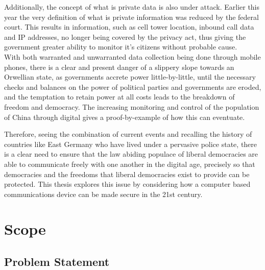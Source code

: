 Additionally, the concept of what is private data is also under attack.
Earlier this year the very definition of what is private information was reduced by the federal court.
This results in information, such as cell tower location, inbound call data and IP addresses, no longer being covered by the privacy act, thus giving the government greater ability to monitor it's citizens without probable cause.\cite{Reference37}\\
With both warranted and unwarranted data collection being done through mobile phones, there is a clear and present danger of a slippery slope towards an Orwellian state, as governments accrete power little-by-little, until the necessary checks and balances on the power of political parties and governments are eroded, and the temptation to retain power at all costs leads to the breakdown of freedom and democracy.  The increasing monitoring and control of the population of China through digital gives a proof-by-example of how this can eventuate.

Therefore, seeing the combination of current events and recalling the history of countries like East Germany who have lived under a pervasive police state, there is a clear need to ensure that the law abiding populace of liberal democracies are able to communicate freely with one another in the digital age, precisely so that democracies and the freedoms that liberal democracies exist to provide can be protected.
This thesis explores this issue by considering how a computer based communications device can be made secure in the 21st century.


\section{Scope}

\label{Ch1 Sec2}


\subsection{Problem Statement}

\label{Ch1 Sec2 Sub1}


